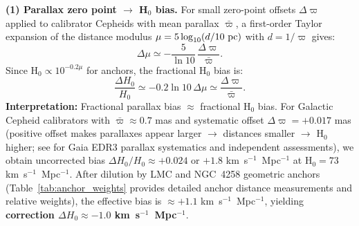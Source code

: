 \documentclass[preprint, linenumbers]{aastex701}
\begin{document}
\textbf{(1) Parallax zero point $\rightarrow$ H$_0$ bias.} For small zero-point offsets $\Delta\varpi$ applied to calibrator Cepheids with mean parallax $\bar{\varpi}$, a first-order Taylor expansion of the distance modulus $\mu = 5\log_{10}(d/{\rm 10~pc})$ with $d = 1/\varpi$ gives:
\begin{equation}
\Delta\mu \simeq -\frac{5}{\ln 10}\,\frac{\Delta\varpi}{\bar{\varpi}}.
\end{equation}
Since H$_0 \propto 10^{-0.2\mu}$ for anchors, the fractional H$_0$ bias is:
\begin{equation}
\frac{\Delta H_0}{H_0} \simeq -0.2\ln 10\,\Delta\mu \simeq \frac{\Delta\varpi}{\bar{\varpi}}.
\end{equation}
\textbf{Interpretation:} Fractional parallax bias $\approx$ fractional H$_0$ bias. For Galactic Cepheid calibrators with $\bar{\varpi} \approx 0.7$ mas and systematic offset $\Delta\varpi = +0.017$ mas (positive offset makes parallaxes appear larger $\rightarrow$ distances smaller $\rightarrow$ H$_0$ higher; see \citealt{Lindegren2021,Riess2021,Breuval2022} for Gaia EDR3 parallax systematics and independent assessments), we obtain uncorrected bias $\Delta H_0/H_0 \approx +0.024$ or $+1.8$ km~s$^{-1}$~Mpc$^{-1}$ at H$_0 = 73$ km~s$^{-1}$~Mpc$^{-1}$. After dilution by LMC and NGC~4258 geometric anchors (Table~\ref{tab:anchor_weights} provides detailed anchor distance measurements and relative weights), the effective bias is $\approx +1.1$ km~s$^{-1}$~Mpc$^{-1}$, yielding \textbf{correction $\Delta H_0 \approx -1.0$ km~s$^{-1}$~Mpc$^{-1}$}.
\end{document}
